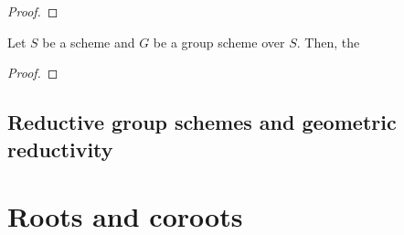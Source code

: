             \begin{lemma} \label{lemma: representability_of_automorphism_groups_of_schemes}
                
            \end{lemma}
                \begin{proof}
                    
                \end{proof}
            \begin{corollary} \label{coro: representability_of_normalisers_and_transporteres}
                Let $S$ be a scheme and $G$ be a group scheme over $S$. Then, the 
            \end{corollary}
                \begin{proof}
                    
                \end{proof}
    
    \subsection{Reductive group schemes and geometric reductivity}

\section{Roots and coroots}